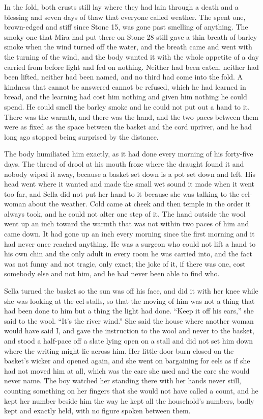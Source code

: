 In the fold, both crusts still lay where they had lain through a death and a blessing and seven days of thaw that everyone called weather. The spent one, brown-edged and stiff since Stone 15, was gone past smelling of anything. The smoky one that Mira had put there on Stone 28 still gave a thin breath of barley smoke when the wind turned off the water, and the breath came and went with the turning of the wind, and the body wanted it with the whole appetite of a day carried from before light and fed on nothing. Neither had been eaten, neither had been lifted, neither had been named, and no third had come into the fold. A kindness that cannot be answered cannot be refused, which he had learned in bread, and the learning had cost him nothing and given him nothing he could spend. He could smell the barley smoke and he could not put out a hand to it. There was the warmth, and there was the hand, and the two paces between them were as fixed as the space between the basket and the cord upriver, and he had long ago stopped being surprised by the distance.

The body humiliated him exactly, as it had done every morning of his forty-five days. The thread of drool at his mouth froze where the draught found it and nobody wiped it away, because a basket set down is a pot set down and left. His head went where it wanted and made the small wet sound it made when it went too far, and Sella did not put her hand to it because she was talking to the eel-woman about the weather. Cold came at cheek and then temple in the order it always took, and he could not alter one step of it. The hand outside the wool went up an inch toward the warmth that was not within two paces of him and came down. It had gone up an inch every morning since the first morning and it had never once reached anything. He was a surgeon who could not lift a hand to his own chin and the only adult in every room he was carried into, and the fact was not funny and not tragic, only exact; the joke of it, if there was one, cost somebody else and not him, and he had never been able to find who.

Sella turned the basket so the sun was off his face, and did it with her knee while she was looking at the eel-stalls, so that the moving of him was not a thing that had been done to him but a thing the light had done. “Keep it off his ears,” she said to the wool. “It's the river wind.” She said the house where another woman would have said I, and gave the instruction to the wool and never to the basket, and stood a half-pace off a slate lying open on a stall and did not set him down where the writing might lie across him. Her little-door burn closed on the basket's wicker and opened again, and she went on bargaining for eels as if she had not moved him at all, which was the care she used and the care she would never name. The boy watched her standing there with her hands never still, counting something on her fingers that she would not have called a count, and he kept her number beside him the way he kept all the household's numbers, badly kept and exactly held, with no figure spoken between them.

